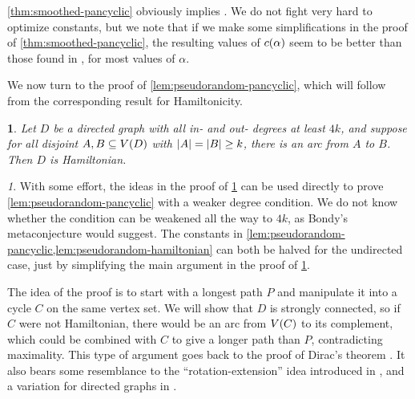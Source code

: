 \documentclass[11pt,english]{article}
\theoremstyle{plain}
\theoremstyle{definition}
\theoremstyle{definition}
\theoremstyle{plain}
\theoremstyle{plain}
\theoremstyle{plain}
\newtheorem{lem}[thm]{\protect\lemmaname}
\theoremstyle{plain}
\theoremstyle{remark}
\newtheorem{rem}[thm]{\protect\remarkname}
\theoremstyle{remark}
\let\originalleft\left
\let\originalright\right
\renewcommand{\left}{\mathopen{}\mathclose\bgroup\originalleft}
\renewcommand{\right}{\aftergroup\egroup\originalright}
\providecommand{\lemmaname}{Lemma}
\providecommand{\remarkname}{Remark}
\begin{document}
\ref{thm:smoothed-pancyclic} obviously implies \cite[Theorems~1 and~3]{BFM03}.
We do not fight very hard to optimize constants, but we note that
if we make some simplifications in the proof of \ref{thm:smoothed-pancyclic},
the resulting values of $\cdi\left(\alpha\right)$ seem to be better
than those found in \cite{BFM03}, for most values of $\alpha$.

We now turn to the proof of \ref{lem:pseudorandom-pancyclic}, which
will follow from the corresponding result for Hamiltonicity.
\begin{lem}
\label{lem:pseudorandom-hamiltonian}Let $D$ be a directed graph
with all in- and out- degrees at least $4k$, and suppose for all
disjoint $A,B\subseteq V\left(D\right)$ with $\left|A\right|=\left|B\right|\ge k$,
there is an arc from $A$ to $B$. Then $D$ is Hamiltonian.\end{lem}
\begin{rem}
\label{rem:constants}With some effort, the ideas in the proof of
\ref{lem:pseudorandom-hamiltonian} can be used directly to prove
 \ref{lem:pseudorandom-pancyclic} with a weaker degree condition.
We do not know whether the condition can be weakened all the way to
$4k$, as Bondy's metaconjecture would suggest. The constants in \ref{lem:pseudorandom-pancyclic,lem:pseudorandom-hamiltonian}
can both be halved for the undirected case, just by simplifying the
main argument in the proof of \ref{lem:pseudorandom-hamiltonian}.

The idea of the proof is to start with a longest path $P$ and manipulate
it into a cycle $C$ on the same vertex set. We will show that $D$
is strongly connected, so if $C$ were not Hamiltonian, there would
be an arc from $V\left(C\right)$ to its complement, which could be
combined with $C$ to give a longer path than $P$, contradicting
maximality. This type of argument goes back to the proof of Dirac's
theorem \cite[Theorem~3]{Dir52}. It also bears some resemblance to
the ``rotation-extension'' idea introduced in \cite{Pos76}, and
a variation for directed graphs in \cite[Section~4.3]{FK05}.\end{rem}
\end{document}
